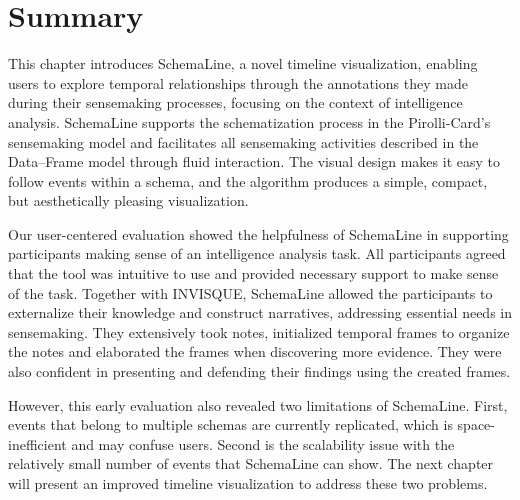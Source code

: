 \section{Summary}
This chapter introduces SchemaLine, a novel timeline visualization, enabling users to explore temporal relationships through the annotations they made during their sensemaking processes, focusing on the context of intelligence analysis. SchemaLine supports the schematization process in the Pirolli-Card's sensemaking model and facilitates all sensemaking activities described in the Data--Frame model through fluid interaction. The visual design makes it easy to follow events within a schema, and the algorithm produces a simple, compact, but aesthetically pleasing visualization.

Our user-centered evaluation showed the helpfulness of SchemaLine in supporting participants making sense of an intelligence analysis task. All participants agreed that the tool was intuitive to use and provided necessary support to make sense of the task. Together with INVISQUE, SchemaLine allowed the participants to externalize their knowledge and construct narratives, addressing essential needs in sensemaking. They extensively took notes, initialized temporal frames to organize the notes and elaborated the frames when discovering more evidence. They were also confident in presenting and defending their findings using the created frames.

However, this early evaluation also revealed two limitations of SchemaLine. First, events that belong to multiple schemas are currently replicated, which is space-inefficient and may confuse users. Second is the scalability issue with the relatively small number of events that SchemaLine can show. The next chapter will present an improved timeline visualization to address these two problems.